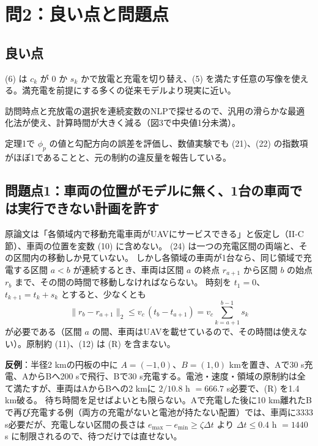 \documentclass[uplatex,dvipdfmx,a4paper,11pt,jafont=haranoaji]{bxjsarticle}
\newcommand{\answerpart}[1]{\par\Needspace{6\baselineskip}\subsection*{#1}}
\newcommand{\norm}[1]{\lVert #1\rVert_2}
\begin{document}
\FloatBarrier
\section{問2：良い点と問題点}

\answerpart{良い点}
\begin{description}[leftmargin=1em]
  \item[部分充電と非線形充電を一つの式で扱う] (6) は $c_k$ が $0$ か $s_k$ かで放電と充電を切り替え、(5) を満たす任意の写像を使える。満充電を前提にする多くの従来モデルより現実に近い。
  \item[整数変数を使わない] 訪問時点と充放電の選択を連続変数のNLPで探せるので、汎用の滑らかな最適化法が使え、計算時間が大きく減る（図3で中央値1分未満）。
  \item[近似の質を定量化している] 定理1で $\phi_p$ の値と勾配方向の誤差を評価し、数値実験でも (21)、(22) の指数項がほぼ1であることと、元の制約の違反量を報告している。
\end{description}

\answerpart{問題点1：車両の位置がモデルに無く、1台の車両では実行できない計画を許す}
原論文は「各領域内で移動充電車両がUAVにサービスできる」と仮定し（II-C節）、車両の位置を変数 (10) に含めない。
(24) は一つの充電区間の両端と、その区間内の移動しか見ていない。
しかし各領域の車両が1台なら、同じ領域で充電する区間 $a<b$ が連続するとき、車両は区間 $a$ の終点 $r_{a+1}$ から区間 $b$ の始点 $r_b$ まで、その間の時間で移動しなければならない。
時刻を $t_1=0$、$t_{k+1}=t_k+s_k$ とすると、少なくとも
\begin{equation*}
  \norm{r_b-r_{a+1}}\le v_c\,(t_b-t_{a+1})=v_c\sum_{k=a+1}^{b-1}s_k \tag{R}
\end{equation*}
が必要である（区間 $a$ の間、車両はUAVを載せているので、その時間は使えない）。原制約 (11)、(12) は (R) を含まない。

\textbf{反例}：半径2 kmの円板の中に $A=(-1,0)$、$B=(1,0)$ kmを置き、Aで30 s充電、AからBへ200 sで飛行、Bで30 s充電する。電池・速度・領域の原制約は全て満たすが、車両はAからBへの2 kmに $2/10.8$ h $=666.7$ s必要で、(R) を1.4 km破る。
待ち時間を足せばよいとも限らない。Aで充電した後に10 km離れたBで再び充電する例（両方の充電がないと電池が持たない配置）では、車両に3333 s必要だが、充電しない区間の長さは $e_{\max}-e_{\min}\ge\zeta\Delta t$ より $\Delta t\le0.4$ h $=1440$ s に制限されるので、待つだけでは直せない。
\end{document}
